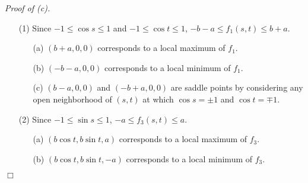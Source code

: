 \documentclass{article}
\begin{document}
\emph{Proof of (c).}
\begin{enumerate}
\item[(1)]
  Since $-1 \leq \cos s \leq 1$ and $-1 \leq \cos t \leq 1$,
  $-b-a \leq f_1(s,t) \leq b+a$.

  \begin{enumerate}
  \item[(a)]
    $(b+a, 0, 0)$ corresponds to a local maximum of $f_1$.

  \item[(b)]
    $(-b-a, 0, 0)$ corresponds to a local minimum of $f_1$.

  \item[(c)]
    $(b - a, 0, 0)$ and $(-b + a, 0, 0)$ are saddle points
    by considering any open neighborhood of $(s,t)$
    at which $\cos s = \pm 1$ and $\cos t = \mp 1$.
  \end{enumerate}

\item[(2)]
  Since $-1 \leq \sin s \leq 1$,
  $-a \leq f_3(s,t) \leq a$.
  \begin{enumerate}
  \item[(a)]
    $(b\cos t, b\sin t, a)$ corresponds to a local maximum of $f_3$.

  \item[(b)]
    $(b\cos t, b\sin t, -a)$ corresponds to a local minimum of $f_3$.
  \end{enumerate}
\end{enumerate}
$\Box$ \\
\end{document}
